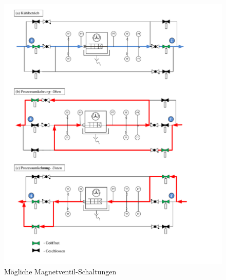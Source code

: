 \begin{figure}%
\centering		
\hspace{2cm}\includegraphics[width=1.15\textwidth]{Pictures/Schaltschema.pdf}
\caption{Mögliche Magnetventil-Schaltungen}
\label{fig:Magnetventil}
\end{figure}

